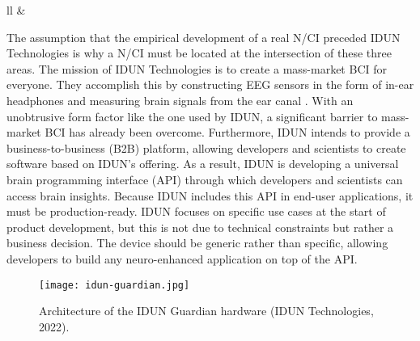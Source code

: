 \begin{table}[!ht]
{\begin{tabular}{ll}
        &
                                                                                                               \\ \hline
    \end{tabular}%
  }
  \vspace{10pt}
  \caption{Axes label descriptions of the three-dimensionality for the definition of a N/CI as shown on \autoref{fig:nci-definition}}
  \label{tab:nci-axis}
\end{table}

The assumption that the empirical development of a real N/CI preceded IDUN Technologies is why a N/CI must be located at the intersection of these three areas. The mission of IDUN Technologies is to create a mass-market BCI for everyone. They accomplish this by constructing EEG sensors in the form of in-ear headphones and measuring brain signals from the ear canal \citep{idun_guardian_nodate}. With an unobtrusive form factor like the one used by IDUN, a significant barrier to mass-market BCI has already been overcome. Furthermore, IDUN intends to provide a business-to-business (B2B) platform, allowing developers and scientists to create software based on IDUN's offering. As a result, IDUN is developing a universal brain programming interface (API) through which developers and scientists can access brain insights. Because IDUN includes this API in end-user applications, it must be production-ready. IDUN focuses on specific use cases at the start of product development, but this is not due to technical constraints but rather a business decision. The device should be generic rather than specific, allowing developers to build any neuro-enhanced application on top of the API.

\begin{figure}[!ht]
  \centering
  \texttt{[image: idun-guardian.jpg]}
  \caption{Architecture of the IDUN Guardian hardware (IDUN Technologies, 2022).}
  \label{fig:idun-guardian}
\end{figure}

